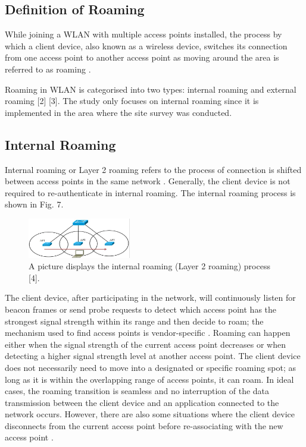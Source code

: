 \documentclass[conference]{IEEEtran}
\begin{document}
\subsection{Definition of Roaming}
While joining a WLAN with multiple access points installed, the process by which a client device, also known as a wireless device, switches its connection from one access point to another access point as moving around the area is referred to as roaming \cite{article_example}.

Roaming in WLAN is categorised into two types: internal roaming and external roaming [2] [3]. The study only focuses on internal roaming since it is implemented in the area where the site survey was conducted.

\subsection{Internal Roaming}
Internal roaming or Layer 2 roaming refers to the process of connection is shifted between access points in the same network \cite{article_example}. Generally, the client device is not required to re-authenticate in internal roaming. The internal roaming process is shown in Fig. 7.

\begin{figure}[htbp]
    \centering
    \includegraphics[width=0.4\textwidth]{internal_roaming.png}
    \caption{A picture displays the internal roaming (Layer 2 roaming) process
[4].}
\end{figure}

The client device, after participating in the network, will continuously listen for beacon frames or send probe requests to detect which access point has the strongest signal strength within its range and then decide to roam; the mechanism used to find access points is vendor-specific \cite{article_example}. Roaming can happen either when the signal strength of the current access point decreases or when detecting a higher signal strength level at another access point. The client device does not necessarily need to move into a designated or specific roaming spot; as long as it is within the overlapping range of access points, it can roam. In ideal cases, the roaming transition is seamless and no interruption of the data transmission between the client device and an application connected to the network occurs. However, there are also some situations where the client device disconnects from the current access point before re-associating with the new access point \cite{article_example} \cite{book_example}.
\end{document}
